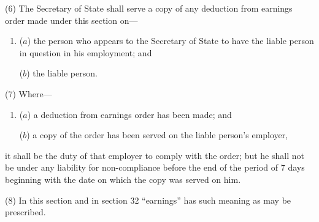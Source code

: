\documentclass[12pt,a4paper]{article}
\begin{document}
(6) The 
Secretary of State  %
shall serve a copy of any deduction from earnings order 
made  %
under this section on—
\begin{enumerate}\item[]
($a$) the person who appears to the 
Secretary of State  %
to have the liable person in question in his employment; and

($b$) the liable person.
\end{enumerate}

(7) Where—
\begin{enumerate}\item[]
($a$) a deduction from earnings order has been made; and

($b$) a copy of the order has been served on the liable person’s employer,
\end{enumerate}
it shall be the duty of that employer to comply with the order; but he shall not be under any liability for non-compliance before the end of the period of 7 days beginning with the date on which the copy was served on him.

(8) In this section and in section 32 “earnings” has such meaning as may be prescribed.

%
%
%
%
%
\end{document}
